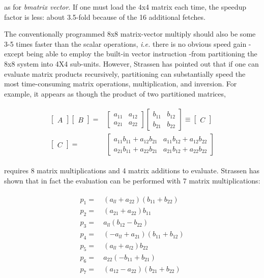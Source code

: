 as for \textit{bmatrix vector}. If one must load the 4x4 matrix each time, the speedup factor is less: about 3.5-fold because of the 16 additional fetches.

The conventionally programmed 8x8 matrix-vector multiply should also be some 3-5 times faster than the scalar operations, \textit{i.e.} there is no obvious speed gain -except being able to employ the built-in vector instruction  -from partitioning the 8x8 system into 4X4 sub-units. However, Strassen has pointed out that if one can evaluate matrix products recursively, partitioning can substantially speed the most time-consuming matrix operations, multiplication, and inversion. For example, it appears as though the product of two partitioned matrices,

\begin{align}
\begin{split}
    \begin{bmatrix}A\end{bmatrix}
    \begin{bmatrix}B\end{bmatrix} =& 
    \begin{bmatrix}
      a_{11} & a_{12} \\
      a_{21} & a_{22}
    \end{bmatrix}
    \begin{bmatrix}
      b_{11} & b_{12} \\
      b_{21} & b_{22}
    \end{bmatrix}
    \equiv
    \begin{bmatrix}C\end{bmatrix} \\
    \begin{bmatrix}C\end{bmatrix} =&
    \begin{bmatrix}
      a_{11}b_{11}+a_{12}b_{21} & a_{11}b_{12}+a_{12}b_{22} \\
      a_{21}b_{11}+a_{22}b_{21} & a_{21}b_{12}+a_{22}b_{22}
    \end{bmatrix}
\end{split}
\end{align}

requires 8 matrix multiplications and 4 matrix additions to evaluate. Strassen has shown that in fact the evaluation can be performed with 7 matrix multiplications:

\begin{align}
\begin{split}
    p_{1} =&\ (a_{ll} + a_{22}) (b_{11} + b_{22})  \\
    p_{2} =&\ (a_{21} + a_{22}) b_{11}             \\
    p_{3} =&\  a_{ll} (b_{12} - b_{22})            \\
    p_{4} =&\ (-a_{ll} + a_{21}) (b_{11} + b_{12}) \\
    p_{5} =&\ (a_{ll} + a_{l2}) b_{22}             \\
    p_{6} =&\  a_{22} (-b_{11} + b_{21})           \\
    p_{7} =&\ (a_{12} - a_{22}) (b_{21} + b_{22})  
\end{split}
\end{align}

